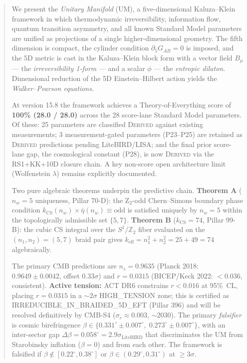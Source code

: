 \documentclass[12pt,a4paper]{article}
\begin{document}
\begin{abstract}
We present the \emph{Unitary Manifold} (UM), a five-dimensional Kaluza--Klein
framework in which thermodynamic irreversibility, information flow, quantum
transition asymmetry, and all known Standard Model parameters are unified as
projections of a single higher-dimensional geometry.  The fifth dimension is
compact, the cylinder condition $\partial_5 G_{AB}=0$ is imposed, and the 5D
metric is cast in the Kaluza--Klein block form with a vector field $B_\mu$ — the
\emph{irreversibility 1-form} — and a scalar $\phi$ — the \emph{entropic
dilaton}.  Dimensional reduction of the 5D Einstein--Hilbert action yields the
\emph{Walker--Pearson equations}.

At version 15.8 the framework achieves a Theory-of-Everything score of
\textbf{100\% (28.0 / 28.0)} across the 28 score-lane Standard Model parameters.
Of these: 25 parameters are classified \textsc{Derived} against existing
measurements; 3 measurement-gated parameters (P23--P25) are retained as
\textsc{Derived} predictions pending LiteBIRD/LISA; and the final prior
score-lane gap, the cosmological constant (P28), is now \textsc{Derived} via
the RS1+KK+10D closure chain.  A key non-score open architecture limit
(Wolfenstein $\lambda$) remains explicitly documented.

Two pure algebraic theorems underpin the predictive chain.  \textbf{Theorem A}
($n_w = 5$ uniqueness, Pillar 70-D): the Z$_2$-odd Chern--Simons boundary phase
condition $k_\mathrm{CS}(n_w) \times \bar\eta(n_w) \equiv \text{odd}$ is
satisfied uniquely by $n_w = 5$ within the topologically admissible set
$\{5, 7\}$.  \textbf{Theorem B} ($k_\mathrm{CS} = 74$, Pillar 99-B): the cubic
CS integral over the $S^1/\mathbb{Z}_2$ fiber evaluated on the $(n_1,n_2)=(5,7)$
braid pair gives $k_\mathrm{eff} = n_1^2 + n_2^2 = 25 + 49 = 74$ algebraically.

The primary CMB predictions are $n_s = 0.9635$ (Planck 2018: $0.9649 \pm 0.0042$,
offset $0.33\sigma$) and $r = 0.0315$ (BICEP/Keck 2022: $<0.036$, consistent).
\textbf{Active tension:} ACT DR6 constrains $r < 0.016$ at 95\%~CL, placing
$r = 0.0315$ in a $\sim 2\sigma$ HIGH\_TENSION zone; this is certified as
IRREDUCIBLE\_IN\_BRAIDED\_5D\_EFT (Pillar 396) and will be resolved definitively
by CMB-S4 ($\sigma_r \approx 0.003$, $\sim 2030$).  The primary
\emph{falsifier} is cosmic birefringence $\beta \in \{0.331^\circ
\pm 0.007^\circ,\; 0.273^\circ \pm 0.007^\circ\}$, with an inter-sector gap
$\Delta\beta = 0.058^\circ = 2.9\sigma_\mathrm{LiteBIRD}$ that discriminates the
UM from Starobinsky inflation ($\beta = 0$) and from each other.  The framework
is falsified if $\beta \notin [0.22^\circ, 0.38^\circ]$ or $\beta \in
(0.29^\circ, 0.31^\circ)$ at $\geq 3\sigma$.


\end{abstract}
\end{document}
